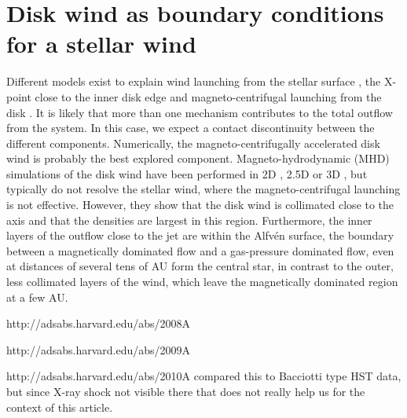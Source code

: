 \section{Disk wind as boundary conditions for a stellar wind}
Different models exist to explain wind launching from the stellar surface \citep{1988ApJ...332L..41K,2005ApJ...632L.135M}, the X-point close to the inner disk edge \citep{1994ApJ...429..781S} and magneto-centrifugal launching from the disk \citep{1982MNRAS.199..883B,2005ApJ...630..945A}. It is likely that more than one mechanism contributes to the total outflow from the system. In this case, we expect a contact discontinuity between the different components. Numerically, the magneto-centrifugally accelerated disk wind is probably the best explored component. Magneto-hydrodynamic (MHD) simulations of the disk wind have been performed in 2D \citep{2005ApJ...630..945A}, 2.5D \citep{2011ApJ...728L..11R} or 3D \citep{2006ApJ...653L..33A}, but typically do not resolve the stellar wind, where the magneto-centrifugal launching is not effective. However, they show that the disk wind is collimated close to the axis and that the densities are largest in this region. Furthermore, the inner layers of the outflow close to the jet are within the Alfv\'en surface, the boundary between a magnetically dominated flow and a gas-pressure dominated flow, even at distances of several tens of AU form the central star, in contrast to the outer, less collimated layers of the wind, which leave the magnetically dominated region at a few AU.

http://adsabs.harvard.edu/abs/2008A%

http://adsabs.harvard.edu/abs/2009A%

http://adsabs.harvard.edu/abs/2010A%
compared this to Bacciotti type HST data, but since X-ray shock not visible there that does not really help us for the context of this article.